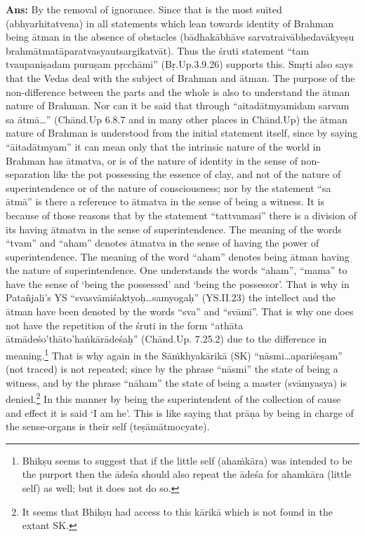 \textbf{Ans:} By the removal of ignorance. Since that is the most suited (abhyarhitatvena) in all statements which lean towards identity of Brahman being ātman in the absence of obstacles (bādhakābhāve sarvatraivābhedavākyeṣu brahmātmatāparatvasyautsargikatvāt). Thus the śruti statement “tam tvaupaniṣadam puruṣam pṛcchāmi” (Bṛ.Up.3.9.26) supports this. Smṛti also says that the Vedas deal with the subject of Brahman and ātman. The purpose of the non-difference between the parts and the whole is also to understand the ātman nature of Brahman. Nor can it be said that through “aitadātmyamidam sarvam sa ātmā…” (Chānd.Up 6.8.7 and in many other places in Chānd.Up) the ātman nature of Brahman is understood from the initial statement itself, since by saying “āitadātmyam” it can mean only that the intrinsic nature of the world in Brahman has ātmatva, or is of the nature of identity in the sense of non-separation like the pot possessing the essence of clay, and not of the nature of superintendence or of the nature of consciousness; nor by the statement “sa ātmā” is there a reference to ātmatva in the sense of being a witness. It is because of those reasons that by the statement “tattvamasi” there is a division of its having ātmatva in the sense of superintendence. The meaning of the words “tvam” and “aham” denotes ātmatva in the sense of having the power of superintendence. The meaning of the word “aham” denotes being ātman having the nature of superintendence. One understands the words “aham”, “mama” to have the sense of ‘being the possessed’ and ‘being the possessor’. That is why in Patañjali’s YS “svasvāmiśaktyoḥ…samyogaḥ” (YS.II.23) the intellect and the ātman have been denoted by the words “sva” and “svāmī”. That is why one does not have the repetition of the śruti in the form “athāta ātmādeśo’thāto’haṅkārādeśaḥ” (Chānd.Up. 7.25.2) due to the difference in meaning.\footnote{Bhikṣu seems to suggest that if the little self (ahaṁkāra) was intended to be the purport then the ādeśa should also repeat the ādeśa for ahamkāra (little self) as well; but it does not do so.} That is why again in the Sāṁkhyakārikā (SK) “nāsmi…\-apariśeṣam” (not traced) is not repeated; since by the phrase “nāsmi” the state of being a witness, and by the phrase “nāham” the state of being a master (svāmyasya) is denied.\footnote{It seems that Bhikṣu had access to this kārikā which is not found in the extant SK.} In this manner by being the superintendent of the collection of cause and effect it is said ‘I am he’. This is like saying that prāṇa by being in charge of the sense-organs is their self (teṣāmātmocyate). 

